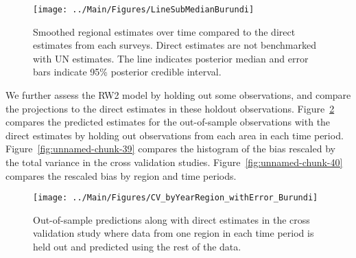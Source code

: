 \documentclass[12pt]{article}\usepackage[]{graphicx}\usepackage[]{color}
\newenvironment{knitrout}{}{} %
\begin{document}
\begin{knitrout}
\color{fgcolor}\begin{figure}[bht]

{\centering \texttt{[image: ../Main/Figures/LineSubMedianBurundi]} 

}

\caption[Smoothed regional estimates over time compared to the direct estimates from each surveys]{Smoothed regional estimates over time compared to the direct estimates from each surveys. Direct estimates are not benchmarked with UN estimates. The line indicates posterior median and error bars indicate 95\% posterior credible interval.}\label{fig:unnamed-chunk-37}
\end{figure}


\end{knitrout}
We further assess the RW2 model by holding out some observations, and compare the projections to the direct estimates in these holdout observations. Figure~\ref{fig:unnamed-chunk-38} compares the predicted estimates for the out-of-sample observations  with the direct estimates by holding out observations from each area in each time period.  Figure~\ref{fig:unnamed-chunk-39} compares the histogram of the bias rescaled by the total variance in the cross validation studies. Figure~\ref{fig:unnamed-chunk-40} compares the rescaled bias by region and time periods.



 
\begin{knitrout}
\color{fgcolor}\begin{figure}[bht]

{\centering \texttt{[image: ../Main/Figures/CV\_byYearRegion\_withError\_Burundi]} 

}

\caption[Out-of-sample predictions along with direct estimates in the cross validation study where data from one region in each time period is held out and predicted using the rest of the data]{Out-of-sample predictions along with direct estimates in the cross validation study where data from one region in each time period is held out and predicted using the rest of the data.}\label{fig:unnamed-chunk-38}
\end{figure}


\end{knitrout}
\end{document}
